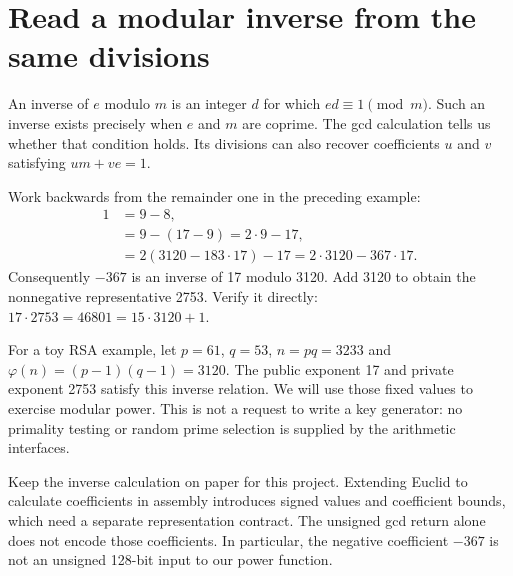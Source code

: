 \section{Read a modular inverse from the same divisions}
An inverse of \(e\) modulo \(m\) is an integer \(d\) for which
\(ed\equiv1\pmod m\). Such an inverse exists precisely when \(e\) and \(m\) are
coprime. The gcd calculation tells us whether that condition holds. Its divisions can
also recover coefficients \(u\) and \(v\) satisfying \(um+ve=1\).

Work backwards from the remainder one in the preceding example:
\[
  \begin{aligned}
    1 & =9-8,                                         \\
      & =9-(17-9)=2\cdot9-17,                         \\
      & =2(3120-183\cdot17)-17=2\cdot3120-367\cdot17.
  \end{aligned}
\]
Consequently \(-367\) is an inverse of 17 modulo 3120. Add 3120 to obtain the
nonnegative representative 2753. Verify it directly:
\(17\cdot2753=46801=15\cdot3120+1\).

For a toy RSA example, let \(p=61\), \(q=53\), \(n=pq=3233\) and
\(\varphi(n)=(p-1)(q-1)=3120\). The public exponent 17 and private exponent 2753
satisfy this inverse relation. We will use those fixed values to exercise modular
power. This is not a request to write a key generator: no primality testing or random
prime selection is supplied by the arithmetic interfaces.

Keep the inverse calculation on paper for this project. Extending Euclid to calculate
coefficients in assembly introduces signed values and coefficient bounds, which need
a separate representation contract. The unsigned gcd return alone does not encode
those coefficients. In particular, the negative coefficient \(-367\) is not an unsigned
128-bit input to our power function.
